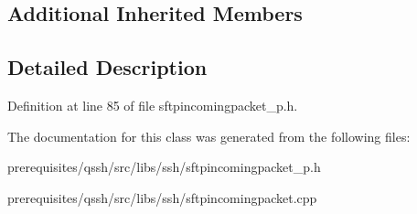 \subsection*{Additional Inherited Members}


\subsection{Detailed Description}


Definition at line 85 of file sftpincomingpacket\+\_\+p.\+h.



The documentation for this class was generated from the following files\+:\begin{DoxyCompactItemize}
\item 
prerequisites/qssh/src/libs/ssh/sftpincomingpacket\+\_\+p.\+h\item 
prerequisites/qssh/src/libs/ssh/sftpincomingpacket.\+cpp\end{DoxyCompactItemize}
